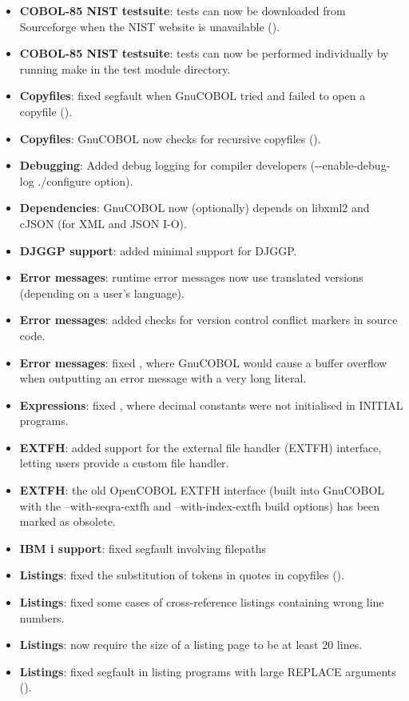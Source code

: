 \begin{itemize}
\item \textbf{COBOL-85 NIST testsuite}: tests can now be downloaded from Sourceforge when the NIST website is unavailable ().
\item \textbf{COBOL-85 NIST testsuite}: tests can now be performed individually by running make in the test module directory.
\item \textbf{Copyfiles}: fixed segfault when GnuCOBOL tried and failed to open a copyfile ().
\item \textbf{Copyfiles}: GnuCOBOL now checks for recursive copyfiles ().
\item \textbf{Debugging}: Added debug logging for compiler developers (-{}-enable-debug-log ./configure option).
\item \textbf{Dependencies}: GnuCOBOL now (optionally) depends on libxml2 and cJSON (for XML and JSON I-O).
\item \textbf{DJGGP support}: added minimal support for DJGGP.
\item \textbf{Error messages}: runtime error messages now use translated versions (depending on a user's language).
\item \textbf{Error messages}: added checks for version control conflict markers in source code.
\item \textbf{Error messages}: fixed , where GnuCOBOL would cause a buffer overflow when outputting an error message with a very long literal.
\item \textbf{Expressions}: fixed , where decimal constants were not initialised in INITIAL programs.
\item \textbf{EXTFH}: added support for the external file handler (EXTFH) interface, letting users provide a custom file handler.
\item \textbf{EXTFH}: the old OpenCOBOL EXTFH interface (built into GnuCOBOL with the --with-seqra-extfh and --with-index-extfh build options) has been marked as obsolete.
\item \textbf{IBM i support}: fixed segfault involving filepaths
\item \textbf{Listings}: fixed the substitution of tokens in quotes in copyfiles ().
\item \textbf{Listings}: fixed some cases of cross-reference listings containing wrong line numbers.
\item \textbf{Listings}: now require the size of a listing page to be at least 20 lines.
\item \textbf{Listings}: fixed segfault in listing programs with large REPLACE arguments ().

\end{itemize}
